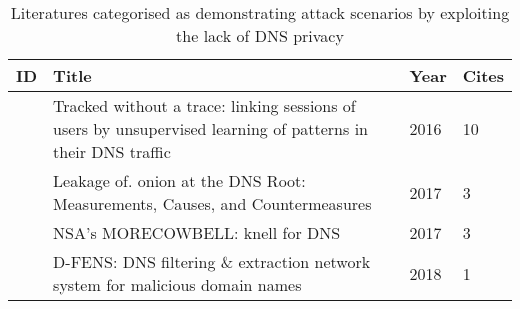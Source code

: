 \begin{table}[h!]
    \begin{tabular}{ | l | p{10.5cm} | l | l | }
        \hline
            ID & Title & Year & Cites \\ \hline
            \cite{kirchler2016tracked} & Tracked without a trace: linking sessions of users by unsupervised learning of patterns in their DNS traffic & 2016 & 10 \\ \hline
            \cite{mohaisen2017leakage} & Leakage of. onion at the DNS Root: Measurements, Causes, and Countermeasures & 2017 & 3 \\ \hline
            \cite{grothoff2017nsa} & NSA's MORECOWBELL: knell for DNS & 2017 & 3 \\ \hline
            \cite{spaulding2018d} & D-FENS: DNS filtering \& extraction network system for malicious domain names & 2018 & 1 \\ \hline
        \end{tabular}
        \caption{Literatures categorised as demonstrating attack scenarios by exploiting the lack of DNS privacy}
\label{attacks}
\end{table}

